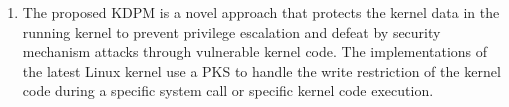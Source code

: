 




\begin{enumerate}%
\item The proposed KDPM is a novel approach that protects the kernel data in the
running kernel to prevent privilege escalation and defeat by security mechanism
attacks through vulnerable kernel code.
%
The implementations of the latest Linux kernel use a PKS to handle the write restriction
of the kernel code during a specific system call or specific kernel code execution.

% 



\end{enumerate}
